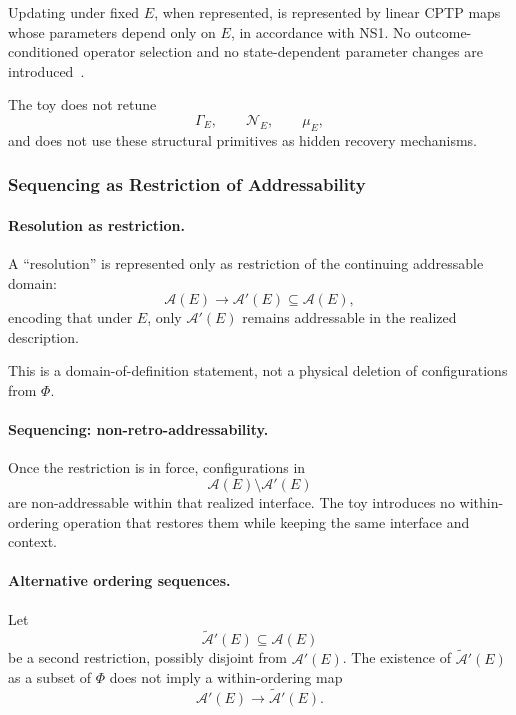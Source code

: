 \documentclass[aps,prx,onecolumn,11pt]{revtex4-2}
\theoremstyle{plain}
\theoremstyle{definition}
\theoremstyle{remark}
\begin{document}
Updating under fixed \(E\), when represented, is represented by linear
CPTP maps whose parameters depend only on \(E\), in accordance with
NS1. No outcome-conditioned operator selection and no state-dependent
parameter changes are introduced~\cite{Kraus1983,NielsenChuang2010,
Watrous2018,Wilde2017}.

The toy does not retune
\[
\Gamma_E,
\qquad
\mathcal N_E,
\qquad
\mu_E,
\]
and does not use these structural primitives as hidden recovery
mechanisms.

\subsubsection{Sequencing as Restriction of Addressability}
\label{toy:finite_dim:sequencing_restriction}

\paragraph{Resolution as restriction.}

A ``resolution'' is represented only as restriction of the continuing
addressable domain:
\[
\mathcal A(E)
\longrightarrow
\mathcal A'(E)\subseteq\mathcal A(E),
\]
encoding that under \(E\), only \(\mathcal A'(E)\) remains addressable
in the realized description.

This is a domain-of-definition statement, not a physical deletion of
configurations from \(\Phi\).

\paragraph{Sequencing: non-retro-addressability.}

Once the restriction is in force, configurations in
\[
\mathcal A(E)\setminus\mathcal A'(E)
\]
are non-addressable within that realized interface. The toy introduces
no within-ordering operation that restores them while keeping the same
interface and context.

\paragraph{Alternative ordering sequences.}

Let
\[
\widetilde{\mathcal A}'(E)\subseteq\mathcal A(E)
\]
be a second restriction, possibly disjoint from \(\mathcal A'(E)\).
The existence of \(\widetilde{\mathcal A}'(E)\) as a subset of \(\Phi\)
does not imply a within-ordering map
\[
\mathcal A'(E)\to\widetilde{\mathcal A}'(E).
\]
\end{document}
